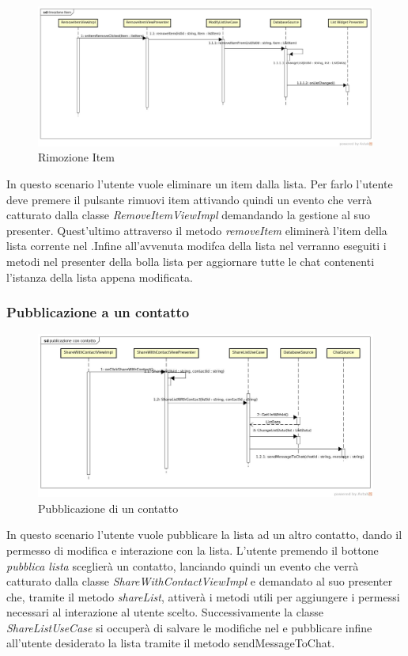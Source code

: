 \label{Rimozione Item }
\begin{figure}[H]
	\centering
	\includegraphics[width=\textwidth]{Sezioni/Diagrammi/App/rimozione_item.jpg}
	\caption{Rimozione Item}
	
\end{figure}
In questo scenario l'utente vuole eliminare un item dalla lista. Per farlo l'utente deve premere il pulsante rimuovi item attivando quindi un evento che verrà catturato dalla classe \textit{RemoveItemViewImpl} demandando la gestione al suo presenter. Quest'ultimo attraverso il metodo \textit{removeItem} eliminerà l'item della lista corrente nel .Infine all'avvenuta modifca della lista nel  verranno eseguiti i metodi nel presenter della bolla lista per aggiornare tutte le chat contenenti l'istanza della lista appena modificata.  
\newpage

\subsubsection{Pubblicazione a un contatto}

\label{Pubblicazione di un contatto}
\begin{figure}[H]
	\centering
	\includegraphics[width=\textwidth]{Sezioni/Diagrammi/App/publicazione_con_contatto.jpg}
	\caption{Pubblicazione di un contatto}
	
\end{figure}
In questo scenario l'utente vuole pubblicare la lista ad un altro contatto, dando il permesso di modifica e interazione con la lista. L'utente premendo il bottone \textit{pubblica lista} sceglierà un contatto, lanciando quindi un evento che verrà catturato dalla classe \textit{ShareWithContactViewImpl} e demandato al suo presenter che, tramite il metodo \textit{shareList}, attiverà i metodi utili per aggiungere i permessi necessari al interazione al utente scelto. Successivamente la classe \textit{ShareListUseCase} si occuperà di salvare le modifiche nel  e pubblicare infine all'utente desiderato la lista tramite il metodo {sendMessageToChat}.



